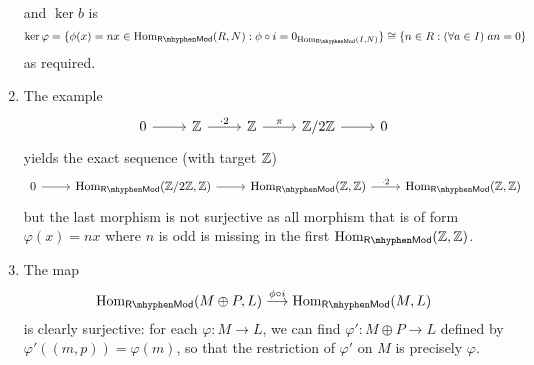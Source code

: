 \begin{pf}
\begin{enumerate}[label=(\roman*)]
\[    \]
    and $\ker b$ is
    \[
    \ker \varphi = \{\phi(x)=nx \in \Hom_\mathsf{R\mhyphen Mod}(R, N): \phi \circ i = 0_{\Hom_\mathsf{R\mhyphen Mod}(I, N)}\} \cong \{n \in R: (\forall a \in I)\; an = 0\}
    \]
    as required.
    \item The example
    \[
    \begin{tikzcd}
    0 \arrow[r] &\Z \arrow[r, "\cdot 2"] &\Z \arrow[r, "\pi"] &\Z/2\Z \arrow[r] &0
    \end{tikzcd}
    \]
    yields the exact sequence (with target $\mathbb{Z}$)
    \[
    \begin{tikzcd}
    0 \arrow[r] &\Hom_\mathsf{R\mhyphen Mod}(\Z/2\Z,\Z) \arrow[r] &\Hom_\mathsf{R\mhyphen Mod}(\Z,\Z) \arrow[r, "\cdot 2"] &\Hom_\mathsf{R\mhyphen Mod}(\Z,\Z)
    \end{tikzcd}
    \]
    but the last morphism is not surjective as all morphism that is of form $\varphi(x) = nx$ where $n$ is odd is missing in the first $\Hom_\mathsf{R\mhyphen Mod}(\Z,\Z)$.
    \item The map
    \[
    \Hom_\mathsf{R\mhyphen Mod}(M\oplus P,L) \overset{\phi \circ i}{\longrightarrow} \Hom_\mathsf{R\mhyphen Mod}(M,L)
    \]
    is clearly surjective: for each $\varphi: M \to L$, we can find $\varphi': M\oplus P \to L$ defined by $\varphi'((m,p)) = \varphi(m)$, so that the restriction of $\varphi'$ on $M$ is precisely $\varphi$.
\end{enumerate}
\end{pf}

